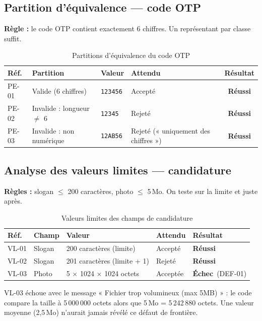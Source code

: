 \documentclass[12pt,a4paper]{report}
\newcommand{\ok}{\textcolor{okgreen}{\textbf{Réussi}}}
\newcommand{\ko}{\textcolor{kored}{\textbf{Échec}}}
\begin{document}
\subsection{Partition d'équivalence --- code OTP}
\textbf{Règle :} le code OTP contient exactement 6 chiffres. Un représentant par classe suffit.
\begin{table}[H]
\centering
\caption{Partitions d'équivalence du code OTP}
\small
\begin{tabular}{@{}llllc@{}}
\toprule
\rowcolor{evlight}\textbf{Réf.} & \textbf{Partition} & \textbf{Valeur} & \textbf{Attendu} & \textbf{Résultat}\\
\midrule
PE-01 & Valide (6 chiffres) & \texttt{123456} & Accepté & \ok\\
PE-02 & Invalide : longueur $\neq$ 6 & \texttt{12345} & Rejeté & \ok\\
PE-03 & Invalide : non numérique & \texttt{12AB56} & Rejeté (« uniquement des chiffres ») & \ok\\
\bottomrule
\end{tabular}
\end{table}

\subsection{Analyse des valeurs limites --- candidature}
\textbf{Règles :} slogan $\leq$ 200 caractères, photo $\leq$ 5\,Mo. On teste sur la limite et juste après.
\begin{table}[H]
\centering
\caption{Valeurs limites des champs de candidature}
\small
\begin{tabular}{@{}lllll@{}}
\toprule
\rowcolor{evlight}\textbf{Réf.} & \textbf{Champ} & \textbf{Valeur} & \textbf{Attendu} & \textbf{Résultat}\\
\midrule
VL-01 & Slogan & 200 caractères (limite) & Accepté & \ok\\
VL-02 & Slogan & 201 caractères (limite + 1) & Rejeté & \ok\\
VL-03 & Photo & 5 $\times$ 1024 $\times$ 1024 octets & Acceptée & \ko\ (DEF-01)\\
\bottomrule
\end{tabular}
\end{table}
VL-03 échoue avec le message « Fichier trop volumineux (max 5MB) » : le code compare la taille à 5\,000\,000 octets alors que 5\,Mo = 5\,242\,880 octets. Une valeur moyenne (2,5\,Mo) n'aurait jamais révélé ce défaut de frontière.
\end{document}
